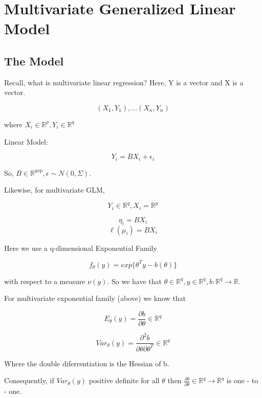 \documentclass[11pt,fleqn]{book} %
\begin{document}


\chapter{Multivariate Generalized Linear Model}

\section{The Model}


Recall, what is multivariate linear regression? Here, Y is a vector and X is a vector. 

		$$(X_1, Y_1), \dots (X_n, Y_n) $$

where $X_i \in \mathbb{R}^p, Y_i \in \mathbb{R}^q$

Linear Model:

		$$Y_i = B X_i + \epsilon_i $$


So, $B \in \mathbb{R}^{q x p}, \epsilon \sim N(0, \Sigma)$. 



Likewise, for multivariate GLM, 

		$$ Y_i \in \mathbb{R}^q , X_i = \mathbb{R}^p$$


		$$\eta_i = B X_i $$
		$$ \ell(\mu_i) = BX_i $$

Here we use a q-dimensional Exponential Family

		$$f_\theta (y) = exp\{\theta^T y - b(\theta)\} $$

with respect to a measure $\nu(y)$. So we have that $\theta \in \mathbb{R}^q, y \in \mathbb{R}^q, b:\mathbb{R}^q \rightarrow \mathbb{R}$. 

\begin{theorem}

For multivariate exponential family (above) we know that 

		$$E_\theta (y) = \frac{\partial b}{\partial \theta} \in \mathbb{R}^q $$

		$$Var_\theta (y) =  \frac{\partial^2 b}{\partial \theta \partial \theta^T} \in \mathbb{R}^q $$	

		Where the double diferrentiation is the Hessian of b. 

		Consequently, if $Var_\theta(y)$ positive definite for all $\theta$ then $\frac{\partial b}{\partial \theta} \in \mathbb{R}^q \rightarrow \mathbb{R}^q$ is one - to - one. 
	
\end{theorem}
\end{document}
